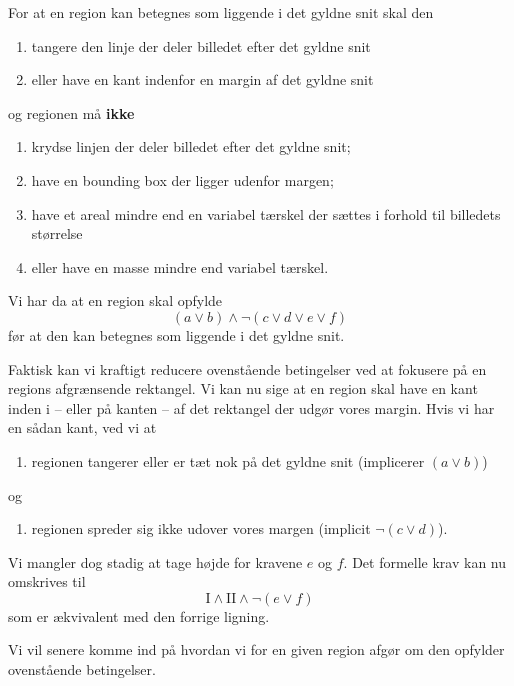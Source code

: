 {For at en region kan betegnes som liggende i det gyldne snit skal den
\begin{enumerate}
	\renewcommand{\labelenumi}{(\alph{enumi})}
	\item tangere den linje der deler billedet efter det gyldne snit
	\item eller have en kant indenfor en margin af det gyldne snit
\end{enumerate}
og regionen må \textbf{ikke}
\begin{enumerate}
	\renewcommand{\labelenumi}{(\alph{enumi})}
	\setcounter{enumi}{2}
	\item krydse linjen der deler billedet efter det gyldne snit;
	\item have en bounding box der ligger udenfor margen;
	\item have et areal mindre end en variabel tærskel der sættes i
		forhold til billedets størrelse
	\item eller have en masse mindre end variabel tærskel.
\end{enumerate}
Vi har da at en region skal opfylde
\begin{equation}
	(a \vee b) \wedge \neg (c \vee d \vee e \vee f)
\end{equation}
før at den kan betegnes som liggende i det gyldne snit.

Faktisk kan vi kraftigt reducere ovenstående betingelser ved at fokusere
på en regions afgrænsende rektangel. Vi kan nu sige at en region skal
have en kant inden i -- eller på kanten -- af det rektangel der udgør
vores margin. Hvis vi har en sådan kant, ved vi at
\begin{enumerate}
	\renewcommand{\labelenumi}{(\Roman{enumi})}
	\item regionen tangerer eller er tæt nok på det gyldne snit
		(implicerer $(a \vee b)$)
\end{enumerate}
og
\begin{enumerate}
	\renewcommand{\labelenumi}{(\Roman{enumi})}
	\setcounter{enumi}{1}
	\item regionen spreder sig ikke udover vores margen (implicit
		$\neg(c \vee d)$).
\end{enumerate}
Vi mangler dog stadig at tage højde for kravene $e$ og $f$. Det formelle
krav kan nu omskrives til
\begin{equation}
	\mathrm{I} \wedge \mathrm{II} \wedge \neg(e \vee f)
\end{equation}
som er ækvivalent med den forrige ligning.

Vi vil senere komme ind på hvordan vi for en given region afgør om den
opfylder ovenstående betingelser.

}

